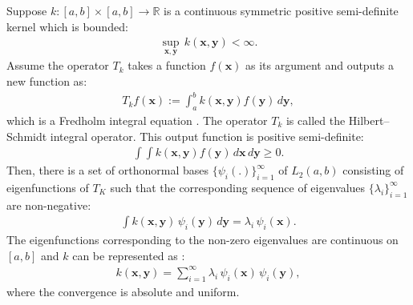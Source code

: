 \documentclass[lang=cn,10pt]{gorgeousnbook}
\numberwithin{equation}{section}%
\numberwithin{figure}{section}%
\begin{document}
\begin{theorem}\label{theorem_Mercer}
Suppose $k: [a,b] \times [a,b] \rightarrow \mathbb{R}$ is a continuous symmetric positive semi-definite kernel which is bounded:
\begin{align}\label{equation_Mercer_theorem_sup_kernel}
\sup_{\boldsymbol{x}, \boldsymbol{y}}\, k(\boldsymbol{x}, \boldsymbol{y}) < \infty.
\end{align}
Assume the operator $T_k$ takes a function $f(\boldsymbol{x})$ as its argument and outputs a new function as:
\begin{align}\label{equation_Mercer_theorem_T_operator}
T_k f(\boldsymbol{x}) := \int_a^b k(\boldsymbol{x}, \boldsymbol{y}) f(\boldsymbol{y})\, d\boldsymbol{y},
\end{align}
which is a Fredholm integral equation \cite{schmidt1908auflosung}. %
The operator $T_k$ is called the Hilbert–Schmidt integral operator.
This output function is positive semi-definite:
\begin{align}
\int\!\!\! \int k(\boldsymbol{x}, \boldsymbol{y}) f(\boldsymbol{y})\, d\boldsymbol{x}\, d\boldsymbol{y} \geq 0.
\end{align}
Then, there is a set of orthonormal bases $\{\psi_i(.)\}_{i=1}^\infty$ of $L_2(a,b)$ consisting of eigenfunctions of $T_K$ such that the corresponding sequence of eigenvalues $\{\lambda_i\}_{i=1}^\infty$ are non-negative: 
\begin{align}\label{equation_Mercer_theorem_eigenfunction_decomposition}
\int k(\boldsymbol{x}, \boldsymbol{y})\, \psi_i(\boldsymbol{y})\, d\boldsymbol{y} = \lambda_i\, \psi_i(\boldsymbol{x}).
\end{align}
The eigenfunctions corresponding to the non-zero eigenvalues are continuous on $[a,b]$ and $k$ can be represented as \cite{aizerman1964theoretical}:
\begin{align}\label{equation_Mercer_theorem_kernel_representation}
k(\boldsymbol{x}, \boldsymbol{y}) = \sum_{i=1}^\infty \lambda_i\, \psi_i(\boldsymbol{x})\, \psi_i(\boldsymbol{y}),
\end{align}
where the convergence is absolute and uniform.
\end{theorem}
\end{document}
